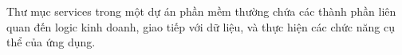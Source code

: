 Thư mục services trong một dự án phần mềm thường chứa các thành phần liên quan đến logic kinh doanh, giao tiếp với dữ liệu,
và thực hiện các chức năng cụ thể của ứng dụng.